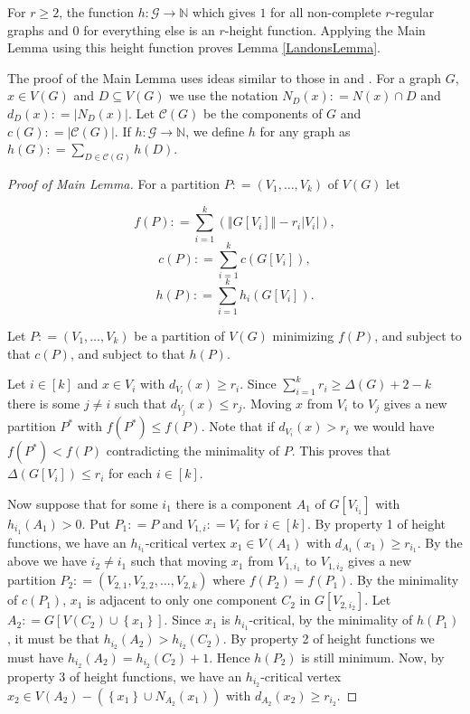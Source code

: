 \documentclass[12pt]{amsart}
\theoremstyle{plain}
\theoremstyle{definition}
\theoremstyle{remark}
\newcommand{\fancy}[1]{\mathcal{#1}}
\newcommand{\IN}{\mathbb{N}}
\newcommand{\G}{\fancy{G}}
\newcommand{\set}[1]{\left\{ #1 \right\}}
\newcommand{\card}[1]{\left|#1\right|}
\newcommand{\size}[1]{\left\Vert#1\right\Vert}
\newcommand{\func}[3]{#1\colon #2 \rightarrow #3}
\newcommand{\irange}[1]{\left[#1\right]}
\newcommand{\parens}[1]{\left( #1 \right)}
\newcommand{\DefinedAs}{\mathrel{\mathop:}=}
\begin{document}
\noindent For $r \geq 2$, the function $\func{h}{\G}{\IN}$ which gives $1$ for all non-complete $r$-regular graphs and $0$ for everything else is an $r$-height function.  Applying the Main Lemma using this height function proves Lemma \ref{LandonsLemma}.

The proof of the Main Lemma uses ideas similar to those in \cite{Kostochka} and \cite{rabern}.  For a graph $G$, $x \in V(G)$ and $D \subseteq V(G)$ we use the notation $N_D(x) \DefinedAs N(x) \cap D$ and $d_D(x) \DefinedAs \card{N_D(x)}$. Let $\fancy{C}(G)$ be the components of $G$ and $c(G) \DefinedAs \card{\fancy{C}(G)}$.  If $\func{h}{\G}{\IN}$, we define $h$ for any graph as $h(G) \DefinedAs \sum_{D \in \fancy{C}(G)} h(D)$.

\begin{proof}[Proof of Main Lemma]
For a partition $P \DefinedAs \parens{V_1, \ldots, V_k}$ of $V(G)$ let

\[f(P) \DefinedAs \sum_{i=1}^k \parens{\size{G[V_i]} - r_i\card{V_i}},\]
\[c(P) \DefinedAs \sum_{i=1}^k c(G[V_i]),\]
\[h(P) \DefinedAs \sum_{i=1}^k h_i(G[V_i]).\]

\noindent Let $P \DefinedAs \parens{V_1, \ldots, V_k}$ be a partition of $V(G)$ minimizing $f(P)$, and subject to that $c(P)$, and subject to that $h(P)$.

Let $i \in \irange{k}$ and $x \in V_i$ with $d_{V_i}(x) \geq r_i$.  Since $\sum_{i=1}^k r_i \geq \Delta(G) + 2 - k$ there is some $j \neq i$ such that $d_{V_j}(x) \leq r_j$.  Moving $x$ from $V_i$ to $V_j$ gives a new partition $P^*$ with $f(P^*) \leq f(P)$.  Note that if $d_{V_i}(x) > r_i$ we would have $f(P^*) < f(P)$ contradicting the minimality of $P$. This proves that $\Delta(G[V_i]) \leq r_i$ for each $i \in \irange{k}$.

Now suppose that for some $i_1$ there is a component $A_1$ of $G[V_{i_1}]$ with $h_{i_1}(A_1) > 0$. Put $P_1 \DefinedAs P$ and $V_{1,i} \DefinedAs V_i$ for $i \in \irange{k}$. By property 1 of height functions, we have an $h_{i_1}$-critical vertex $x_1 \in V(A_1)$ with $d_{A_1}(x_1) \geq r_{i_1}$.  By the above we have $i_2 \neq i_1$ such that moving $x_1$ from $V_{1, i_1}$ to $V_{1, i_2}$ gives a new partition $P_2 \DefinedAs \parens{V_{2, 1}, V_{2,2}, \ldots, V_{2,k}}$ where $f(P_2) = f(P_1)$.  By the minimality of $c(P_1)$, $x_1$ is adjacent to only one component $C_2$ in $G[V_{2, i_2}]$. Let $A_2 \DefinedAs G[V(C_2) \cup \set{x_1}]$.  Since $x_1$ is $h_{i_1}$-critical, by the minimality of $h(P_1)$, it must be that $h_{i_2}(A_2) > h_{i_2}(C_2)$.  By property 2 of height functions we must have $h_{i_2}(A_2) = h_{i_2}(C_2) + 1$.  Hence $h(P_2)$ is still minimum.  Now, by property 3 of height functions, we have an $h_{i_2}$-critical vertex $x_2 \in V(A_2) - \parens{\set{x_1} \cup N_{A_2}(x_1)}$ with $d_{A_2}(x_2) \geq r_{i_2}$. 


\end{proof}
\end{document}
